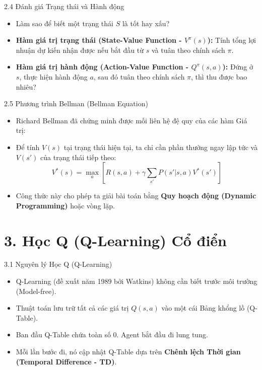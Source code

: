 \documentclass[aspectratio=169, 12pt]{beamer}
\begin{document}
\begin{frame}{2.4 Đánh giá Trạng thái và Hành động}
    \begin{itemize}
        \item Làm sao để biết một trạng thái $S$ là tốt hay xấu?
        \item \textbf{Hàm giá trị trạng thái (State-Value Function - $V^\pi(s)$):} Tính tổng lợi nhuận dự kiến nhận được nếu bắt đầu từ $s$ và tuân theo chính sách $\pi$.
        \item \textbf{Hàm giá trị hành động (Action-Value Function - $Q^\pi(s,a)$):} Đứng ở $s$, thực hiện hành động $a$, sau đó tuân theo chính sách $\pi$, thì thu được bao nhiêu?
    \end{itemize}
\end{frame}

\begin{frame}{2.5 Phương trình Bellman (Bellman Equation)}
    \begin{itemize}
        \item Richard Bellman đã chứng minh được mối liên hệ đệ quy của các hàm Giá trị:
        \item Để tính $V(s)$ tại trạng thái hiện tại, ta chỉ cần phần thưởng ngay lập tức và $V(s')$ của trạng thái tiếp theo:
        $$ V^*(s) = \max_a \left[ R(s,a) + \gamma \sum_{s'} P(s'|s,a) V^*(s') \right] $$
        \item Công thức này cho phép ta giải bài toán bằng \textbf{Quy hoạch động (Dynamic Programming)} hoặc vòng lặp.
    \end{itemize}
\end{frame}


\section{3. Học Q (Q-Learning) Cổ điển}

\begin{frame}{3.1 Nguyên lý Học Q (Q-Learning)}
    \begin{itemize}
        \item Q-Learning (đề xuất năm 1989 bởi Watkins) không cần biết trước môi trường (Model-free).
        \item Thuật toán lưu trữ tất cả các giá trị $Q(s, a)$ vào một cái Bảng khổng lồ (Q-Table).
        \item Ban đầu Q-Table chứa toàn số 0. Agent bắt đầu đi lung tung.
        \item Mỗi lần bước đi, nó cập nhật Q-Table dựa trên \textbf{Chênh lệch Thời gian (Temporal Difference - TD)}.
    \end{itemize}
\end{frame}
\end{document}
